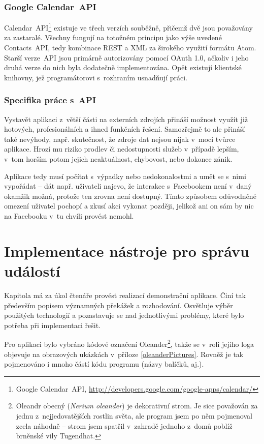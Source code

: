 \documentclass[12pt,oneside,final]{fithesis2}
\begin{document}
\subsection{Google Calendar~API}
Calendar~API\footnote{Google Calendar~API, \url{http://developers.google.com/google-apps/calendar/}} existuje ve třech verzích souběžně, přičemž dvě jsou považovány za zastaralé. Všechny fungují na totožném principu jako výše uvedené Contacts~API, tedy kombinace REST a XML za širokého využití formátu Atom. Starší verze~API jsou primárně autorizovány pomocí OAuth 1.0, ačkoliv i jeho druhá verze do nich byla dodatečně implementována. Opět existují klientské knihovny, jež programátorovi s~rozhraním usnadňují práci.

\subsection{Specifika práce s~API}
Vystavět aplikaci z~větší části na externích zdrojích přináší možnost využít již hotových, profesionálních a ihned funkčních řešení. Samozřejmě to ale přináší také nevýhody, např. skutečnost, že zdroje dat nejsou nijak v~moci tvůrce aplikace. Hrozí mu riziko prodlev či nedostupnosti služeb v~případě lepším, v~tom horším potom jejich neaktuálnost, chybovost, nebo dokonce zánik.

Aplikace tedy musí počítat s~výpadky nebo nedokonalostmi a umět se s~nimi vypořádat -- dát např. uživateli najevo, že interakce s~Facebookem není v~daný okamžik možná, protože ten zrovna není dostupný. Tímto způsobem odůvodněné omezení uživatel pochopí a zkusí akci vykonat později, jelikož ani on sám by nic na Facebooku v~tu chvíli provést nemohl.


\chapter{Implementace nástroje pro správu událostí}
Kapitola má za úkol čtenáře provést realizací demonstrační aplikace. Činí tak především popisem významných překážek a rozhodování. Osvětluje výběr použitých technologií a pozastavuje se nad jednotlivými problémy, které bylo potřeba při implementaci řešit.

Pro aplikaci bylo vybráno kódové označení Oleander\footnote{Oleandr obecný (\emph{Nerium oleander}) je dekorativní strom. Je sice považován za jednu z~nejjedovatějších rostlin světa, ale program jsem po něm pojmenoval zcela náhodně -- strom jsem spatřil v~zahradě jednoho z~domů poblíž brněnské vily Tugendhat.}, takže se v~roli jejího loga objevuje na obrazových ukázkách v~příloze \ref{oleanderPictures}. Rovněž je tak pojmenováno i mnoho částí kódu programu (názvy balíčků, aj.).
\end{document}
